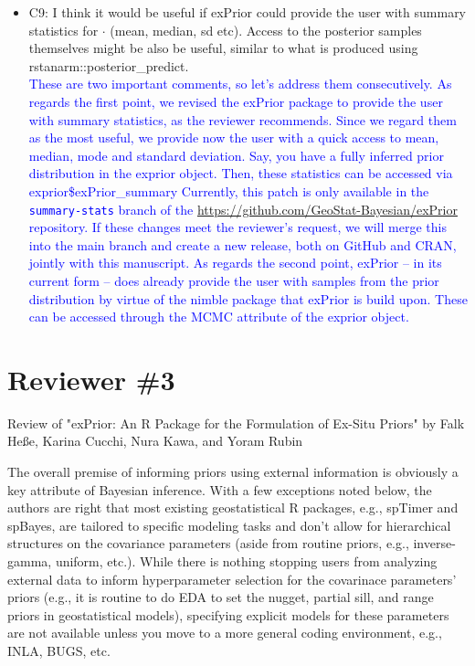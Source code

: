 \documentclass{article}
\begin{document}
\begin{itemize}
    
    \item C9: I think it would be useful if exPrior could provide the user with summary statistics for $\cdot$ (mean, median, sd etc). Access to the posterior samples themselves might be also be useful, similar to what is produced using rstanarm::posterior\_predict.\\
    \textcolor{blue}{These are two important comments, so let's address them consecutively. 
    As regards the first point, we revised the exPrior package to provide the user with summary statistics, as the reviewer recommends. Since we regard them as the most useful, we provide now the user with a quick access to mean, median, mode and standard deviation. Say, you have a fully inferred prior distribution in the exprior object. Then, these statistics can be accessed via exprior\$exPrior\_summary}
    \textcolor{blue}{Currently, this patch is only available in the \texttt{summary-stats} branch of the \url{https://github.com/GeoStat-Bayesian/exPrior} repository. If these changes meet the reviewer's request, we will merge this into the main branch and create a new release, both on GitHub and CRAN, jointly with this manuscript.}
    \textcolor{blue}{As regards the second point, exPrior -- in its current form -- does already provide the user with samples from the prior distribution by virtue of the nimble package that exPrior is build upon. These can be accessed through the MCMC attribute of the exprior object.}
    
\end{itemize}


\newpage
\section*{Reviewer \#3}

Review of "exPrior: An R Package for the Formulation of Ex-Situ Priors" by Falk He{\ss}e, Karina Cucchi, Nura Kawa, and Yoram Rubin

The overall premise of informing priors using external information is obviously a key attribute of Bayesian inference. With a few exceptions noted below, the authors are right that most existing geostatistical R packages, e.g., spTimer and spBayes, are tailored to specific modeling tasks and don't allow for hierarchical structures on the covariance parameters (aside from routine priors, e.g., inverse-gamma, uniform, etc.). While there is nothing stopping users from analyzing external data to inform hyperparameter selection for the covarinace parameters' priors (e.g., it is routine to do EDA to set the nugget, partial sill, and range priors in geostatistical models), specifying explicit models for these parameters are not available unless you move to a more general coding environment, e.g., INLA, BUGS, etc.
\end{document}
